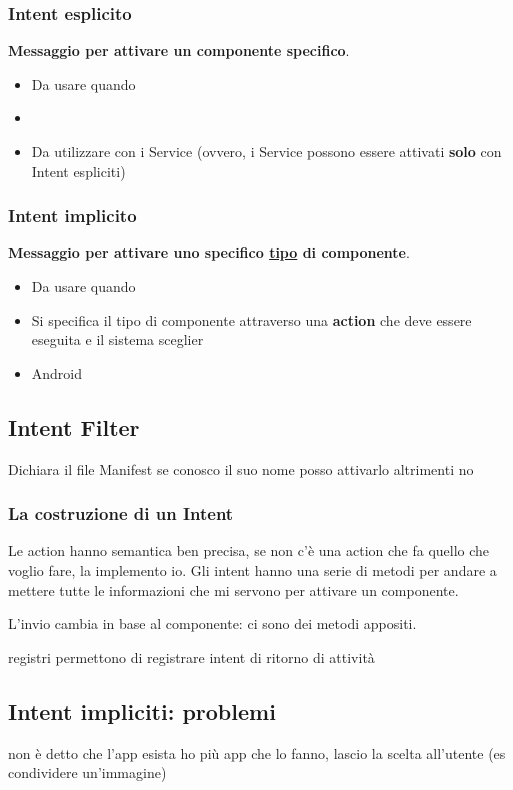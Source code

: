 \subsubsection{Intent esplicito}
\par \textbf{Messaggio per attivare un componente specifico}.
\begin{itemize}
    \item Da usare quando
    \item 
    \item Da utilizzare con i Service (ovvero, i Service possono essere attivati \textbf{solo} con Intent espliciti)
\end{itemize}

\subsubsection{Intent implicito}
\par \textbf{Messaggio per attivare uno specifico \underline{tipo} di componente}.
\begin{itemize}
    \item Da usare quando
    \item Si specifica il tipo di componente attraverso una \textbf{action} che deve essere eseguita e il sistema sceglier
    \item Android
\end{itemize}

\subsection{Intent Filter}
Dichiara il file Manifest
se conosco il suo nome posso attivarlo altrimenti no

\subsubsection{La costruzione di un Intent}

Le action hanno semantica ben precisa, se non c'è una action che fa quello che voglio fare, la implemento io.
Gli intent hanno una serie di metodi per andare a mettere tutte le informazioni che mi servono per attivare un componente.

L'invio cambia in base al componente: ci sono dei metodi appositi.

registri permettono di registrare intent di ritorno di attività

\subsection{Intent impliciti: problemi}
non è detto che l'app esista
ho più app che lo fanno, lascio la scelta all'utente (es condividere un'immagine)


